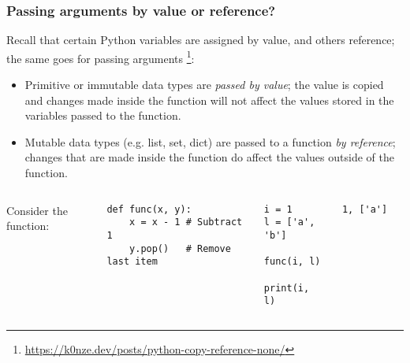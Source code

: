 {\nologo
\begin{frame}[fragile]
  \frametitle{Passing arguments by value or reference?}
  Recall that certain Python variables are assigned by value, and others reference; the same goes for passing arguments \footnote{\href{https://k0nze.dev/posts/python-copy-reference-none/}{https://k0nze.dev/posts/python-copy-reference-none/}}:
  \begin{itemize}
    \item Primitive or immutable data types are \emph{passed by value}; the value is copied and changes made inside the function will not affect the values stored in the variables passed to the function.
    \item Mutable data types (e.g. list, set, dict) are passed to a function \emph{by reference}; changes that are made inside the function do affect the values outside of the function.
  \end{itemize}
  \begin{columns}[t]
    
    Consider the function:

    \begin{lstlisting}
def func(x, y):
    x = x - 1 # Subtract 1
    y.pop()   # Remove last item
    \end{lstlisting}\pause
    \begin{lstlisting}
i = 1
l = ['a', 'b']

func(i, l)

print(i, l)
    \end{lstlisting}
    \begin{lstlisting}[style=PyOutput]
1, ['a']      
    \end{lstlisting}
  \end{columns}
\end{frame}
}



